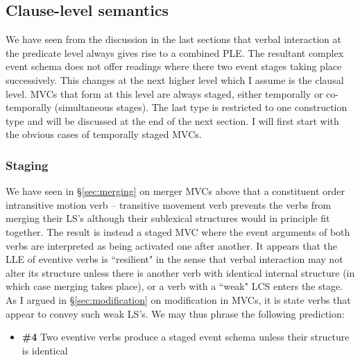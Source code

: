 \subsection{Clause-level semantics} \label{sec:clause-level}

We have seen from the discussion in the last sections that verbal interaction at the predicate level always gives rise to a combined PLE. The resultant complex event schema does not offer readings where there two event stages taking place successively. This changes at the next higher level which I assume is the clausal level. MVCs that form at this level are always staged, either temporally or co-temporally (simultaneous stages). The last type is restricted to one construction type and will be discussed at the end of the next section. I will first start with the obvious cases of temporally staged MVCs.

\subsubsection{Staging}\label{sec:staging}

We have seen in §\ref{sec:merging} on merger MVCs above that a constituent order intransitive motion verb -- transitive movement verb prevents the verbs from merging their LS's although their sublexical structures would in principle fit together. The result is instead a staged MVC where the event arguments of both verbs are interpreted as being activated one after another. It appears that the LLE of eventive verbs is ``resilient" in the sense that verbal interaction may not alter its structure unless there is another verb with identical internal structure (in which case merging takes place), or a verb with a ``weak" LCS enters the stage. As I argued in §\ref{sec:modification} on modification in MVCs, it is state verbs that appear to convey such weak LS's. We may thus phrase the following prediction:

\begin{itemize}
\item \textbf{\#4} Two eventive verbs produce a staged event schema unless their structure is identical
\end{itemize}

